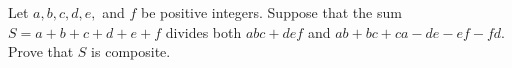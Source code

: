 Let $a, b, c, d, e,$ and $f$ be positive integers. Suppose that the sum $S = a + b + c + d + e + f$ divides both $abc + def$ and $ab + bc + ca - de - ef - fd$. Prove that $S$ is composite.
